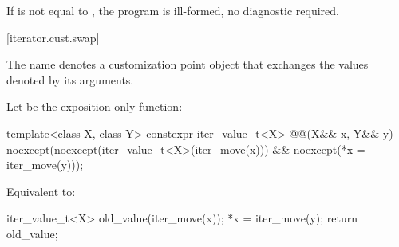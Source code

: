 \pnum
If  is not equal to ,
the program is ill-formed, no diagnostic required.

[iterator.cust.swap]{}

%
\pnum
The name  denotes
a customization point object
that exchanges the values denoted by its
arguments.

\pnum
Let  be the exposition-only function:
\begin{itemdecl}
template<class X, class Y>
  constexpr iter_value_t<X> @@(X&& x, Y&& y)
    noexcept(noexcept(iter_value_t<X>(iter_move(x))) &&
             noexcept(*x = iter_move(y)));
\end{itemdecl}

\begin{itemdescr}
\pnum
\effects
Equivalent to:
\begin{codeblock}
iter_value_t<X> old_value(iter_move(x));
*x = iter_move(y);
return old_value;
\end{codeblock}
\end{itemdescr}

